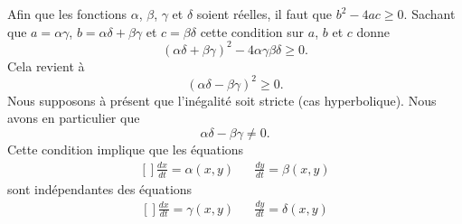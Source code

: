 Afin que les fonctions \( \alpha\), \( \beta\), \( \gamma\) et \( \delta\) soient réelles, il faut que \( b^2-4ac\geq 0\). Sachant que \( a=\alpha\gamma\), \( b=\alpha\delta+\beta\gamma\) et \( c=\beta\delta\) cette condition sur \( a\), \( b\) et \( c\) donne
\begin{equation}
    (\alpha\delta+\beta\gamma)^2-4\alpha\gamma\beta\delta\geq 0.
\end{equation}
Cela revient à
\begin{equation}
    (\alpha\delta-\beta\gamma)^2\geq 0.
\end{equation}
Nous supposons à présent que l'inégalité soit stricte (cas hyperbolique). Nous avons en particulier que
\begin{equation}
    \alpha\delta-\beta\gamma\neq 0.
\end{equation}
Cette condition implique que les équations
\begin{equation}
    \begin{aligned}[]
        \frac{ dx }{ dt }=\alpha(x,y)&&\frac{ dy }{ dt }=\beta(x,y)
    \end{aligned}
\end{equation}
sont indépendantes des équations
\begin{equation}
    \begin{aligned}[]
        \frac{ dx }{ dt }=\gamma(x,y)&&\frac{ dy }{ dt }=\delta(x,y)
    \end{aligned}
\end{equation}


